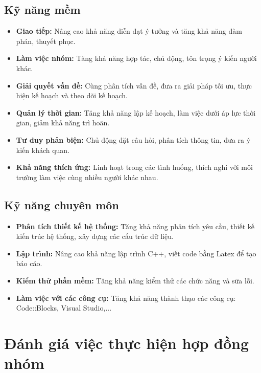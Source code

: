 \documentclass[12pt]{report}
\begin{document}
\section{Kỹ năng mềm}
\begin{itemize}
    \item \textbf{Giao tiếp:} Nâng cao khả năng diễn đạt ý tưởng và tăng khả năng đàm phán, thuyết phục.
    \item \textbf{Làm việc nhóm:} Tăng khả năng hợp tác, chủ động, tôn trọng ý kiến người khác.
    \item \textbf{Giải quyết vấn đề:} Cùng phân tích vấn đề, đưa ra giải pháp tối ưu, thực hiện kế hoạch và theo dõi kế hoạch.
    \item \textbf{Quản lý thời gian:} Tăng khả năng lập kế hoạch, làm việc dưới áp lực thời gian, giảm khả năng trì hoãn.
    \item \textbf{Tư duy phản biện:} Chủ động đặt câu hỏi, phân tích thông tin, đưa ra ý kiến khách quan.
    \item \textbf{Khả năng thích ứng:} Linh hoạt trong các tình huống, thích nghi với môi trường làm việc cùng nhiều người khác nhau.
\end{itemize}
\section{Kỹ năng chuyên môn}
\begin{itemize}
    \item \textbf{Phân tích thiết kế hệ thống:} Tăng khả năng phân tích yêu cầu, thiết kế kiến trúc hệ thống, xây dựng các cấu trúc dữ liệu.
    \item \textbf{Lập trình:} Nâng cao khả năng lập trình C++, viết code bằng Latex để tạo báo cáo.
    \item \textbf{Kiểm thử phần mềm:} Tăng khả năng kiểm thử các chức năng và sữa lỗi.
    \item \textbf{Làm việc với các công cụ:} Tăng khả năng thành thạo các công cụ: Code::Blocks, Visual Studio,...
\end{itemize}

\chapter{Đánh giá việc thực hiện hợp đồng nhóm}
\label{sec:member_ratings}
\end{document}
